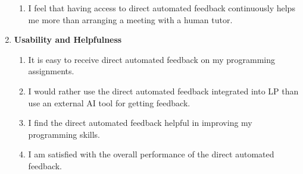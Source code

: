 \documentclass[sigconf,screen,review,anonymous]{acmart}
\begin{document}
\begin{enumerate}[label=\textbf{RQ\arabic*}]
\begin{enumerate}[label=\textbf{Q\arabic*},resume,ref=Q\arabic*]
      \item \label{Q13} I feel that having access to direct automated feedback continuously helps me more than arranging a meeting with a human tutor.
    \end{enumerate}
  \item \textbf{Usability and Helpfulness}
    \begin{enumerate}[label=\textbf{Q\arabic*},resume,ref=Q\arabic*]
      \item \label{Q14} It is easy to receive direct automated feedback on my programming assignments.
      \item \label{Q15} I would rather use the direct automated feedback integrated into LP than use an external AI tool for getting feedback.
      \item \label{Q16} I find the direct automated feedback helpful in improving my programming skills.
      \item \label{Q17} I am satisfied with the overall performance of the direct automated feedback.
    \end{enumerate}
\end{enumerate}



\end{document}
